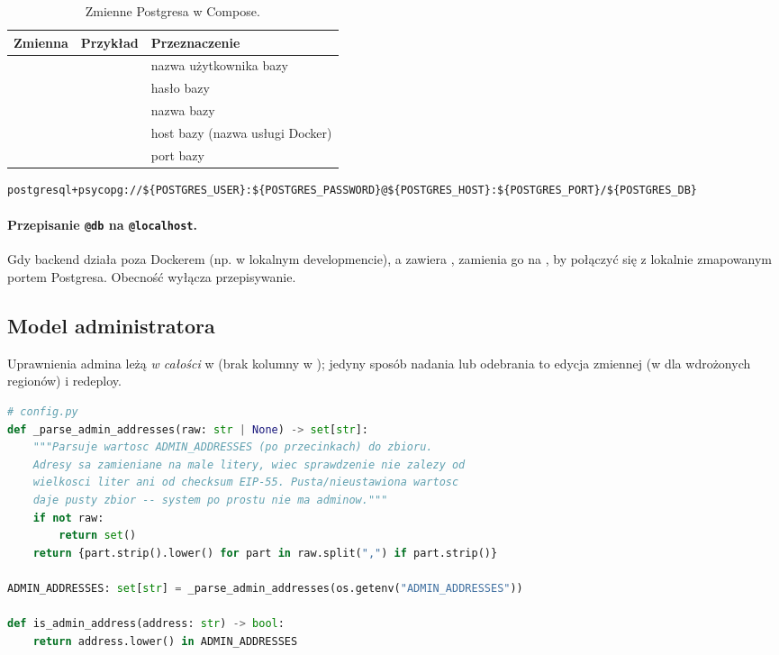 \begin{table}[H]
\centering\small
\renewcommand{\arraystretch}{1.2}
\begin{tabularx}{\textwidth}{@{}llY@{}}
\toprule
\textbf{Zmienna} & \textbf{Przykład} & \textbf{Przeznaczenie} \\
\midrule
{} &  & nazwa użytkownika bazy \\
 &  & hasło bazy \\
 &  & nazwa bazy \\
 &  & host bazy (nazwa usługi Docker) \\
 &  & port bazy \\
\bottomrule
\end{tabularx}
\caption{Zmienne Postgresa w Compose.}
\end{table}

\begin{lstlisting}
postgresql+psycopg://${POSTGRES_USER}:${POSTGRES_PASSWORD}@${POSTGRES_HOST}:${POSTGRES_PORT}/${POSTGRES_DB}
\end{lstlisting}

\paragraph{Przepisanie \texttt{@db} na \texttt{@localhost}.} Gdy backend działa poza
Dockerem (np. w lokalnym developmencie), a  zawiera ,
 zamienia go na , by połączyć się z lokalnie
zmapowanym portem Postgresa. Obecność  wyłącza przepisywanie.

\subsection{Model administratora}
\label{sec:konf-admin}

Uprawnienia admina leżą \emph{w całości} w  (brak kolumny
 w ); jedyny sposób nadania lub odebrania to edycja zmiennej
(w  dla wdrożonych regionów) i redeploy.

\begin{lstlisting}[language=Python]
# config.py
def _parse_admin_addresses(raw: str | None) -> set[str]:
    """Parsuje wartosc ADMIN_ADDRESSES (po przecinkach) do zbioru.
    Adresy sa zamieniane na male litery, wiec sprawdzenie nie zalezy od
    wielkosci liter ani od checksum EIP-55. Pusta/nieustawiona wartosc
    daje pusty zbior -- system po prostu nie ma adminow."""
    if not raw:
        return set()
    return {part.strip().lower() for part in raw.split(",") if part.strip()}

ADMIN_ADDRESSES: set[str] = _parse_admin_addresses(os.getenv("ADMIN_ADDRESSES"))

def is_admin_address(address: str) -> bool:
    return address.lower() in ADMIN_ADDRESSES
\end{lstlisting}

